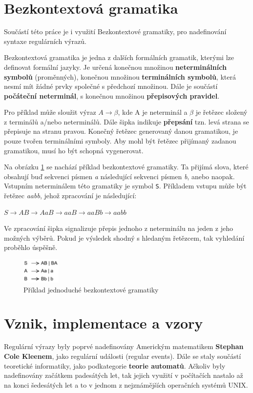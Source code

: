 \section{Bezkontextová gramatika}
Součástí této práce je i využití Bezkontextové gramatiky, pro nadefinování syntaxe regulárních výrazů.

Bezkontextová gramatika je jedna z dalších formálních gramatik, kterými lze definovat formální jazyky. 
Je určená konečnou množinou \textbf{neterminálních symbolů} (proměnných), konečnou množinou \textbf{terminálních symbolů}, která nesmí mít žádné prvky společné s předchozí množinou.
Dále je součástí \textbf{počáteční neterminál}, s konečnou množinou \textbf{přepisových pravidel}\cite{MUNIFL}.

Pro příklad může sloužit výraz $A \longrightarrow \beta$, kde A je neterminál a $\beta$ je řetězec složený z terminálů a/nebo neterminálů. 
Dále šipka indikuje \textbf{přepsání} tzn. levá strana se přepisuje na stranu pravou.
Konečný řetězec generovaný danou gramatikou, je pouze tvořen terminálními symboly.
Aby mohl být řetězec přijímaný zadanou gramatikou, musí ho být schopná vygenerovat.

Na obrázku \ref{fig:CFG} se nachází příklad bezkontextové gramatiky.
Ta přijímá slova, které obsahují buď sekvenci písmen \textit{a} následující sekvenci písmen \textit{b}, anebo naopak.
Vstupním neterminálem této gramatiky je symbol \texttt{S}.
Příkladem vstupu může být řetězec \textit{aabb}, jehož zpracování je následující:

\texttt{$S \rightarrow AB \rightarrow AaB \rightarrow aaB \rightarrow aaBb \rightarrow aabb$}

Ve zpracování šipka signalizuje přepis jednoho z neterminálu na jeden z jeho možných výběrů.
Pokud je výsledek shodný s hledaným řetězcem, tak vyhledání proběhlo úspěšně.

\begin{figure}[!h]
	\centering
	\includegraphics[width=0.17\textwidth]{Figures/CFG.pdf}
	\caption{Příklad jednoduché bezkontextové gramatiky}
	\label{fig:CFG}
\end{figure}


\section{Vznik, implementace a vzory}
Regulární výrazy byly poprvé nadefinovány Americkým matematikem \textbf{Stephan Cole Kleenem}, jako regulární události (regular events)\cite{Leung_2010, Kleene_1951}. 
Dále se staly součástí teoretické informatiky, jako podkategorie \textbf{teorie automatů}.
Ačkoliv byly nadefinovány začátkem padesátých let, tak jejich využití v počítačích nastalo až na konci šedesátých let a to v jednom z nejznámějších operačních systémů UNIX.

